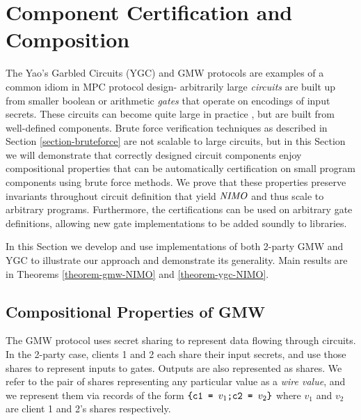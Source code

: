 \section{Component Certification and Composition}
\label{section-composition}



The Yao's Garbled Circuits (YGC) and GMW protocols are examples of a
common idiom in MPC protocol design- arbitrarily large \emph{circuits}
are built up from smaller boolean or arithmetic \emph{gates} that
operate on encodings of input secrets. These circuits can become quite
large in practice \cite{kreuter2012billion}, but are built from
well-defined components. Brute force verification techniques as
described in Section \ref{section-bruteforce} are not scalable to
large circuits, but in this Section we will demonstrate that correctly
designed circuit components enjoy compositional properties
that can be automatically certification on small program components
using brute force methods. We prove that these properties preserve
invariants throughout circuit definition that yield $\mathit{NIMO}$ and thus
scale to arbitrary programs. Furthermore, the certifications can be
used on arbitrary gate definitions, allowing new gate implementations
to be added soundly to libraries.

In this Section we develop and use implementations of both 2-party GMW
and YGC to illustrate our approach and demonstrate its generality.
Main results are in Theorems \ref{theorem-gmw-NIMO} and
\ref{theorem-ygc-NIMO}.

\subsection{Compositional Properties of GMW}

The GMW protocol uses secret sharing to represent data flowing through
circuits. In the 2-party case, clients 1 and 2 each share their input
secrets, and use those shares to represent inputs to gates. Outputs
are also represented as shares. We refer to the pair of shares
representing any particular value as a \emph{wire value}, and
we represent them via records of the form
$
\texttt{\{c1 = } v_1\texttt{;c2 = } v_2\texttt{\}} 
$
where $v_1$ and $v_2$ are client 1 and 2's shares respectively.

